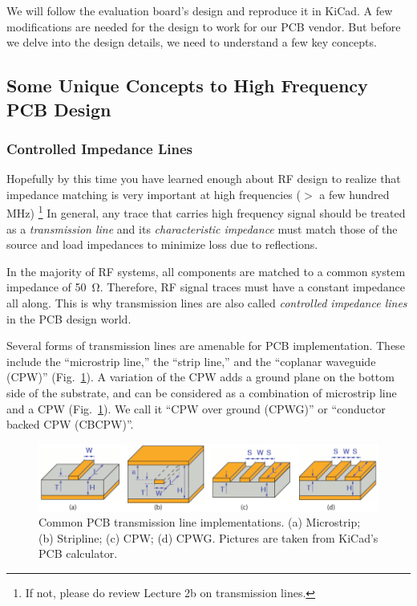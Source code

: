 \documentclass[12pt,letterpaper]{scrartcl}
\begin{document}
We will follow the evaluation board's design and reproduce it in KiCad. A few modifications are needed for the design to work for our PCB vendor. But before we delve into the design details, we need to understand a few key concepts.

\subsection{Some Unique Concepts to High Frequency PCB Design}

\subsubsection{Controlled Impedance Lines}\label{sec:tline}

Hopefully by this time you have learned enough about RF design to realize that impedance matching is very important at high frequencies ($>$ a few hundred MHz) \footnote{If not, please do review Lecture 2b on transmission lines.} In general, any trace that carries high frequency signal should be treated as a \textit{transmission line} and its \textit{characteristic impedance} must match those of the source and load impedances to minimize loss due to reflections. 

In the majority of RF systems, all components are matched to a common system impedance of \SI{50}{\ohm}. Therefore, RF signal traces must have a constant impedance all along. This is why transmission lines are also called \textit{controlled impedance lines} in the PCB design world. 

Several forms of transmission lines are amenable for PCB implementation. These include the ``microstrip line,'' the ``strip line,'' and the ``coplanar waveguide (CPW)'' (Fig.~\ref{fig:tlines}). A variation of the CPW adds a ground plane on the bottom side of the substrate, and can be considered as a combination of microstrip line and a CPW (Fig.~\ref{fig:tlines}). We call it ``CPW over ground (CPWG)'' or ``conductor backed CPW (CBCPW)''. 

	\begin{figure}[h]
		\centering
		\includegraphics[width=6in]{tlines}
		\caption{Common PCB transmission line implementations. (a) Microstrip; (b) Stripline; (c) CPW; (d) CPWG. Pictures are taken from KiCad's PCB calculator.}
		\label{fig:tlines}
	\end{figure}
	
\end{document}
